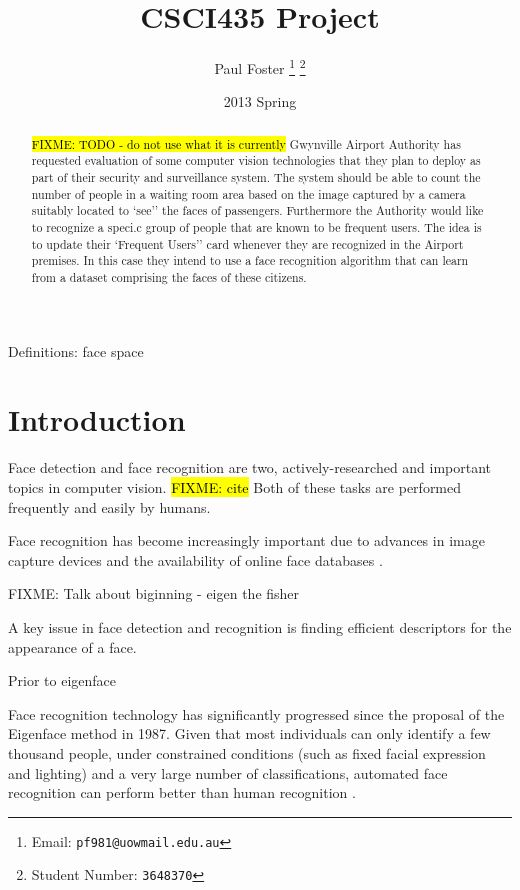\documentclass{article}
\begin{document}
\title{CSCI435 Project}
\author{Paul Foster
	\thanks{Email: \texttt{pf981@uowmail.edu.au}}
	\thanks{Student Number: \texttt{3648370}}}
\date{2013 Spring}

\maketitle

\renewcommand\abstractname{Executive Summary}
\begin{abstract}
\hl{FIXME: TODO - do not use what it is currently}
Gwynville Airport Authority has requested evaluation of some computer vision
technologies that they plan to deploy as part of their security and surveillance system.
The system should be able to count the number of people in a waiting room area based
on the image captured by a camera suitably located to `see'' the faces of passengers. Furthermore the Authority would like to recognize a speci.c group of people that are known
to be frequent users. The idea is to update their `Frequent Users'' card whenever they
are recognized in the Airport premises. In this case they intend to use a face recognition
algorithm that can learn from a dataset comprising the faces of these citizens.
\end{abstract}

Definitions: face space

\section{Introduction}
Face detection and face recognition are two, actively-researched and important topics in computer vision. \hl{FIXME: cite} Both of these tasks are performed frequently and easily by humans.

Face recognition has become increasingly important due to advances in image capture devices and the availability of online face databases \cite{li2011handbook}.



FIXME: Talk about biginning - eigen the fisher



A key issue in face detection and recognition is finding efficient descriptors for the appearance of a face.

Prior to eigenface

Face recognition technology has significantly progressed since the proposal of the Eigenface method in 1987. Given that most individuals can only identify a few thousand people, under constrained conditions (such as fixed facial expression and lighting) and a very large number of classifications, automated face recognition can perform better than human recognition \cite{li2011handbook}.
\end{document}
